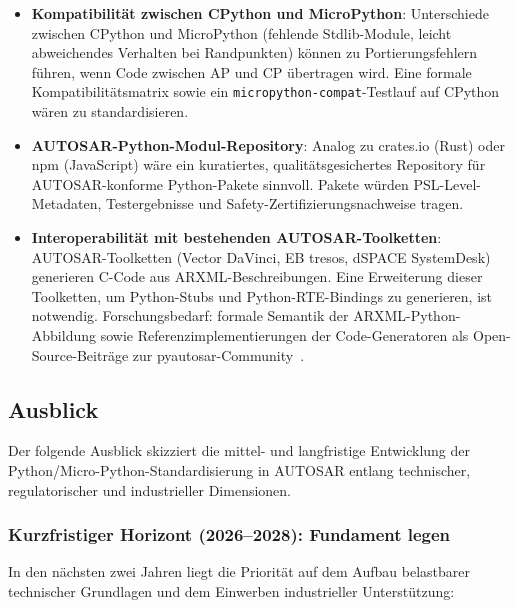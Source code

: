﻿\documentclass[12pt,a4paper,twoside]{article}
\begin{document}
\begin{itemize}
  \item \textbf{Kompatibilität zwischen CPython und MicroPython}:
        Unterschiede zwischen CPython und MicroPython (fehlende Stdlib-Module,
        leicht abweichendes Verhalten bei Randpunkten) können zu Portierungsfehlern
        führen, wenn Code zwischen AP und CP übertragen wird.
        Eine formale Kompatibilitätsmatrix sowie ein
        \texttt{micropython-compat}-Testlauf auf CPython wären zu standardisieren.

  \item \textbf{AUTOSAR-Python-Modul-Repository}:
        Analog zu crates.io (Rust) oder npm (JavaScript) wäre ein
        kuratiertes, qualitätsgesichertes Repository für AUTOSAR-konforme
        Python-Pakete sinnvoll.
        Pakete würden PSL-Level-Metadaten, Testergebnisse und
        Safety-Zertifizierungsnachweise tragen.

  \item \textbf{Interoperabilität mit bestehenden AUTOSAR-Toolketten}:
        AUTOSAR-Toolketten (Vector DaVinci, EB tresos, dSPACE SystemDesk)
        generieren C-Code aus ARXML-Beschreibungen.
        Eine Erweiterung dieser Toolketten, um Python-Stubs und
        Python-RTE-Bindings zu generieren, ist notwendig.
        Forschungsbedarf: formale Semantik der ARXML-Python-Abbildung
        sowie Referenzimplementierungen der Code-Generatoren als
        Open-Source-Beiträge zur pyautosar-Community~\cite{pyautosar_gh}.
\end{itemize}

\subsection{Ausblick}
\label{subsec:ausblick}

Der folgende Ausblick skizziert die mittel- und langfristige Entwicklung
der Python/Micro-\newline Python-Standardisierung in AUTOSAR entlang technischer,
regulatorischer und industrieller Dimensionen.

\subsubsection{Kurzfristiger Horizont (2026--2028): Fundament legen}

In den nächsten zwei Jahren liegt die Priorität auf dem Aufbau belastbarer
technischer Grundlagen und dem Einwerben industrieller Unterstützung:
\end{document}
